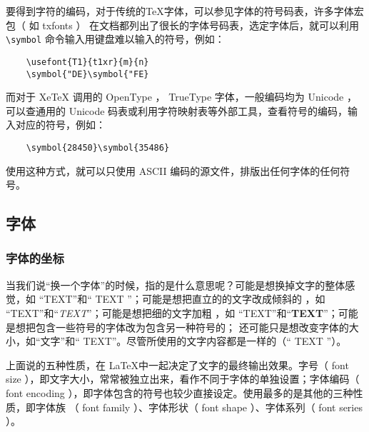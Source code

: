 要得到字符的编码，对于传统的\TeX 字体，可以参见字体的符号码表，许多字体宏包（ 如 txfonts ） 在文档都列出了很长的字体号码表，选定字体后，就可以利用\verb|\symbol| 命令输入用键盘难以输入的符号，例如：

\begin{minipage}[t]{0.45\textwidth}
\begin{lstlisting}
    \usefont{T1}{t1xr}{m}{n}
    \symbol{"DE}\symbol{"FE}
\end{lstlisting}
\end{minipage}
\hfill
\begin{minipage}[t]{0.45\textwidth}
\end{minipage}

而对于 XeTeX 调用的 OpenType ， TrueType 字体，一般编码均为 Unicode ，可以查通用的 Unicode 码表或利用字符映射表等外部工具，查看符号的编码，输入对应的符号，例如：

\begin{minipage}[t]{0.45\textwidth}
\begin{lstlisting}
    \symbol{28450}\symbol{35486}
\end{lstlisting}
\end{minipage}
\hfill
\begin{minipage}[t]{0.45\textwidth}
\end{minipage}

使用这种方式，就可以只使用 ASCII 编码的源文件，排版出任何字体的任何符号。

\subsection{字体}

\subsubsection{字体的坐标} \label{sec:font}

当我们说“换一个字体”的时候，指的是什么意思呢？可能是想换掉文字的整体感觉，如 “{\ttfamily TEXT}”和“ {\sffamily TEXT} ”；可能是想把直立的的文字改成倾斜的 ，如 “TEXT”和“\textit{TEXT}”；可能是想把细的文字加粗 ，如 “TEXT”和“\textbf{TEXT}”；可能是想把包含一些符号的字体改为包含另一种符号的； 还可能只是想改变字体的大小，如“文字”和“{ TEXT}”。尽管所使用的文字内容都是一样的（“ TEXT ”）。

上面说的五种性质，在 \LaTeX 中一起决定了文字的最终输出效果。字号（ font size ），即文字大小，常常被独立出来，看作不同于字体的单独设置；字体编码（ font encoding ），即字体包含的符号也较少直接设定。使用最多的是其他的三种性质，即字体族 （ font family ）、字体形状（ font shape ）、字体系列（ font series ）。

